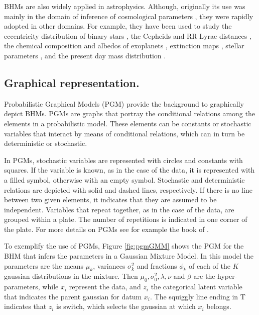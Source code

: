 BHMs are also widely applied in astrophysics. Although, originally its use was mainly in the domain of inference of cosmological parameters \cite[see for example the works of][]{Feeney2013,March2014,Anderes2015,Shariff2016,Alsing2017}, they were rapidly adopted in other domains. For example, they have been used to study the eccentricity distribution of binary stars \citet{Hogg2010}, the Cepheids \citep{Barnes2004} and RR Lyrae distances \citep{Jefferys2007}, the chemical composition \citep{Wolfgang2015} and albedos of exoplanets \citep{Demory2014}, extinction maps \citep{Sale2012}, stellar parameters \citep{Shkedy2007}, and the present day mass distribution \citep{Tapiador2017}.

\subsection{Graphical representation.}
\label{sect:PGM}
Probabilistic Graphical Models (PGM) provide the background to graphically depict BHMs. PGMs are graphs that portray the conditional relations among the elements in a probabilistic model. These elements can be constants or stochastic variables that interact by means of conditional relations, which can in turn be deterministic or stochastic. 

In PGMs, stochastic variables are represented with circles and constants with squares. If the variable is known, as in the case of the data, it is represented with a filled symbol, otherwise with an empty symbol. Stochastic and deterministic relations are depicted with solid and dashed lines, respectively. If there is no line between two given elements, it indicates that they are assumed to be independent. Variables that repeat together, as in the case of the data, are grouped within a plate. The number of repetitions is indicated in one corner of the plate. For more details on PGMs see for example the book of \citet{Koller2009}. 

To exemplify the use of PGMs, Figure \ref{fig:pgmGMM} shows the PGM for the BHM that infers the parameters in a Gaussian Mixture Model. In this model the parameters are the means $\mu_k$, variances $\sigma_k^2$ and fractions $\phi_k$ of each of the $K$ gaussian distributions in the mixture. Then $\mu_0,\sigma_0^2,\lambda,\nu$ and $\beta$ are the hyper-parameters, while $x_i$ represent the data, and $z_i$ the categorical latent variable that indicates the parent gaussian for datum $x_i$. The squiggly line ending in T indicates that $z_i$ is switch, which selects the gaussian at which $x_i$ belongs.

